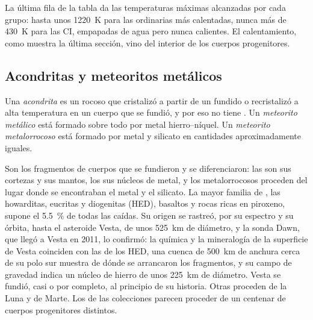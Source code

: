 La última fila de la tabla da las temperaturas máximas alcanzadas por cada grupo:
hasta unos \qty{1220}{K} para las  ordinarias más calentadas, nunca más
de \qty{430}{K} para las  CI, empapadas de agua pero nunca calientes. El
calentamiento, como muestra la última sección, vino del interior de los cuerpos progenitores.

\subsection{Acondritas y meteoritos metálicos}

\begin{definition}
\label{def:b2:planet-formation-meteorites:classes}
Una \emph{acondrita} es un  rocoso que cristalizó
a partir de un fundido o recristalizó a alta temperatura en un cuerpo que se fundió, y
por eso no tiene . Un \emph{meteorito metálico} está formado
sobre todo por metal hierro--níquel. Un \emph{meteorito
metalorrocoso} está formado por metal y silicato en cantidades
aproximadamente iguales.
\end{definition}

Son los fragmentos de cuerpos que se fundieron y se diferenciaron: las  son sus
cortezas y sus mantos, los  sus núcleos de metal, y los metalorrocosos proceden del lugar donde
se encontraban el metal y el silicato. La mayor familia de , las howarditas,
eucritas y diogenitas (HED), basaltos y rocas ricas en piroxeno, supone el
\qty{5.5}{\percent} de todas las caídas. Su origen se rastreó, por su espectro y
su órbita, hasta el asteroide Vesta, de unos \qty{525}{km} de diámetro, y la sonda
Dawn, que llegó a Vesta en 2011, lo confirmó: la química
y la mineralogía de la superficie de Vesta coinciden con las de los  HED, una cuenca
de \qty{500}{km} de anchura cerca de su polo sur muestra de dónde se arrancaron los fragmentos,
y su campo de gravedad indica un núcleo de hierro de unos \qty{225}{km} de diámetro.
Vesta se fundió, casi o por completo, al principio de su historia. Otras  proceden
de la Luna y de Marte. Los  de las colecciones parecen proceder
de un centenar de cuerpos progenitores distintos.

